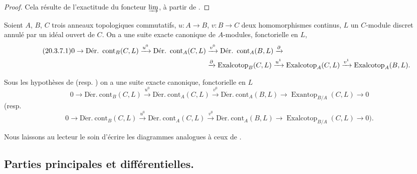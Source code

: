 \begin{proof}
Cela résulte de l'exactitude du foncteur $\varinjlim$, à partir de
.
\end{proof}

\begin{corollary}[20.3.7]
\label{0.20.3.7-fr}
Soient $A$, $B$, $C$ trois anneaux topologiques commutatifs, $u:A\to B$,
$v:B\to C$ deux homomorphismes continus, $L$ un $C$-module discret annulé
par un idéal ouvert de $C$. On a une suite exacte canonique de $A$-modules,
fonctorielle en $L$,
\begin{align}
\tag{20.3.7.1}
\label{0.20.3.7.1-fr}
  0\to\operatorname{D\acute{e}r.\ cont}_B(C,L)\xrightarrow{u^0}
  \operatorname{D\acute{e}r.\ cont}_A(C,L)&\xrightarrow{v^0}
  \operatorname{D\acute{e}r.\ cont}_A(B,L)\xrightarrow{\partial} \\
  &\xrightarrow{\partial}\operatorname{Exalcotop}_B(C,L)\xrightarrow{u^1}
  \operatorname{Exalcotop}_A(C,L)\xrightarrow{v^1}
  \operatorname{Exalcotop}_A(B,L). \notag
\end{align}
\end{corollary}

\begin{corollary}[20.3.8]
\label{0.20.3.8-fr}
Sous les hypothèses de  \textup{(resp.}
) on a une suite exacte canonique, fonctorielle en $L$
\begin{equation}
\tag{20.3.8.1}
\label{0.20.3.8.1-fr}
  0\to\operatorname{D\acute{e}r.\ cont}_B(C,L)\xrightarrow{u^0}
  \operatorname{D\acute{e}r.\ cont}_A(C,L)\xrightarrow{v^0}
  \operatorname{D\acute{e}r.\ cont}_A(B,L)\to
  \operatorname{Exantop}_{B/A}(C,L)\to0
\end{equation}
\textup{(resp.}
\begin{equation}
\tag{20.3.8.2}
\label{0.20.3.8.2-fr}
  0\to\operatorname{D\acute{e}r.\ cont}_B(C,L)\xrightarrow{u^0}
  \operatorname{D\acute{e}r.\ cont}_A(C,L)\xrightarrow{v^0}
  \operatorname{D\acute{e}r.\ cont}_A(B,L)\to
  \operatorname{Exalcotop}_{B/A}(C,L)\to0\text{).}
\end{equation}
\end{corollary}

Nous laissons au lecteur le soin d'écrire les diagrammes analogues à ceux de
.

\subsection{Parties principales et différentielles.}
\label{subsection:0.20.4-fr}

